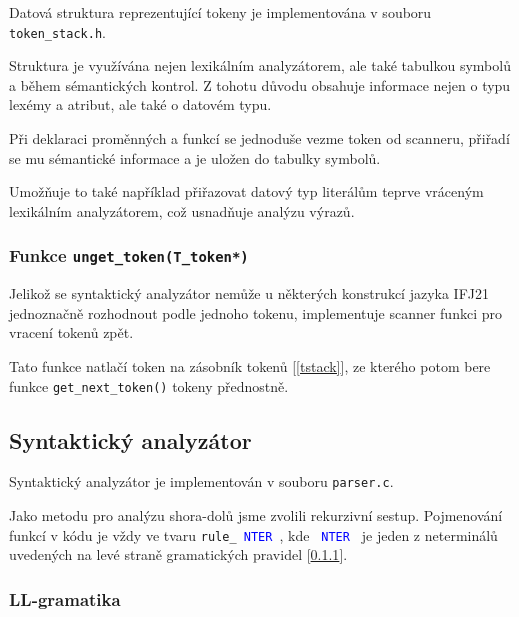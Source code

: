\documentclass[a4paper]{article}
\theoremstyle{definition}
\newcommand{\nter}[1]{\textcolor{blue}{\,#1\,}}
\begin{document}
Datová struktura reprezentující tokeny je implementována v souboru \texttt{token\_stack.h}.

Struktura je využívána nejen lexikálním analyzátorem, ale také tabulkou symbolů a během sémantických kontrol. Z tohotu důvodu obsahuje informace nejen o typu lexémy a atribut, ale také o datovém typu.

Při deklaraci proměnných a funkcí se jednoduše vezme token od scanneru, přiřadí se mu sémantické informace a je uložen do tabulky symbolů.

Umožňuje to také například přiřazovat datový typ literálům teprve vráceným lexikálním analyzátorem, což usnadňuje analýzu výrazů.


\subsubsection{Funkce \texttt{unget\_token(T\_token*)}}\label{sec_unget_token}

Jelikož se syntaktický analyzátor nemůže u některých konstrukcí jazyka IFJ21 jednoznačně rozhodnout podle jednoho tokenu, implementuje scanner funkci pro vracení tokenů zpět.

Tato funkce natlačí token na zásobník tokenů [\ref{tstack}], ze kterého potom bere funkce \texttt{get\_next\_token()} tokeny přednostně.

\subsection{Syntaktický analyzátor}

Syntaktický analyzátor je implementován v souboru \texttt{parser.c}.

Jako metodu pro analýzu shora-dolů jsme zvolili rekurzivní sestup. Pojmenování funkcí v kódu je vždy ve tvaru \texttt{rule\_\nter{NTER}}, kde \texttt{\nter{NTER}} je jeden z neterminálů uvedených na levé straně gramatických pravidel [\ref{sec_grammar}].

\newpage

\subsubsection{LL-gramatika}\label{sec_grammar}
\end{document}
